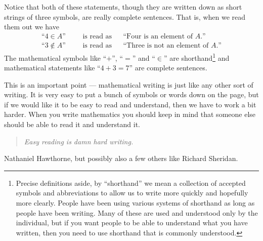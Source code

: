 Notice that both of these statements, though they are written down as short
strings of three symbols, are really complete sentences. That is, when we
read them out we have
\begin{align*}
  \text{``$4 \in A$''}
  &&& \text{is read as} && \text{``Four is an element of  $A$.''} \\
  \text{``$3 \notin A$''}
  &&& \text{is read as} &&  \text{``Three is not an element of $A$.''}
\end{align*}
The mathematical symbols like ``$+$'', ``$=$'' and ``$\in$'' are
shorthand\footnote{Precise definitions aside, by ``shorthand'' we mean a
collection of accepted symbols and abbreviations to allow us to write more
quickly and hopefully more clearly. People have been using various systems of
shorthand as long as people have been writing. Many of these are used and
understood only by the individual, but if you want people to be able to
understand what you have written, then you need to use shorthand that
is commonly understood.} and mathematical statements like ``$4+3=7$'' are complete
sentences.


This is an important point --- mathematical writing is just like any other sort
of writing. It is very easy to put a bunch of symbols or words down on the
page, but if we would like it to be easy to read and understand, then we have
to work a bit harder. When you write mathematics you should keep in mind that
someone else should be able to read it and understand it.
\begin{quote}
 \emph{Easy reading is damn hard writing.}
\end{quote}
\begin{flushright}
 Nathaniel Hawthorne, but possibly also a few others like Richard
Sheridan.
\end{flushright}


